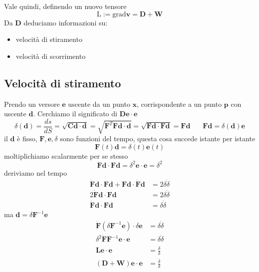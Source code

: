 \documentclass[10pt,a4paper,twoside]{book}
\begin{document}
Vale quindi, definendo un nuovo tensore
\begin{equation*}
\mathrm{L :=grad}\mathbf{v} =\mathbf{D} +\mathbf{W}
\end{equation*}
Da $\mathbf{D}$ deduciamo informazioni su:
\begin{itemize}
\item velocità di stiramento
\item velocità di scorrimento
\end{itemize}
\subsection{Velocità di stiramento}

Prendo un versore $\mathbf{e}$ uscente da un punto $\mathbf{x}$, corrispondente a un punto $\mathbf{p}$ con uscente $\mathbf{d}$. Cerchiamo il significato di $\mathbf{De} \cdotp \mathbf{e}$
\begin{equation*}
\delta (\mathbf{d}) =\frac{ds}{dS} =\sqrt{\mathbf{Cd} \cdotp \mathbf{d}} =\sqrt{\mathbf{F}^{T}\mathbf{Fd} \cdotp \mathbf{d}} =\sqrt{\mathbf{Fd} \cdotp \mathbf{Fd}} =\mathbf{Fd} \ \ \ \ \ \ \ \ \mathbf{Fd} =\delta (\mathbf{d})\mathbf{e}
\end{equation*}
il $\mathbf{d}$ è fisso, $\mathbf{F} ,\mathbf{e} ,\delta $ sono funzioni del tempo, questa cosa succede istante per istante
\begin{equation*}
\mathbf{F}( t)\mathbf{d} =\delta ( t)\mathbf{e}( t)
\end{equation*}
moltiplichiamo scalarmente per se stesso
\begin{equation*}
\mathbf{Fd} \cdotp \mathbf{Fd} =\delta ^{2}\mathbf{e} \cdotp \mathbf{e} =\delta ^{2}
\end{equation*}
deriviamo nel tempo
\begin{align*}
\dot{\mathbf{F}}\mathbf{d} \cdotp \mathbf{Fd} +\mathbf{Fd} \cdotp \dot{\mathbf{F}}\mathbf{d} & =2\delta \dot{\delta }\\
2\dot{\mathbf{F}}\mathbf{d} \cdotp \mathbf{Fd} & =2\delta \dot{\delta }\\
\dot{\mathbf{F}}\mathbf{d} \cdotp \mathbf{Fd} & =\delta \dot{\delta }
\end{align*}
ma $\mathbf{d} =\delta \mathbf{F}^{-1}\mathbf{e}$
\begin{align*}
\dot{\mathbf{F}}\left( \delta \mathbf{F}^{-1}\mathbf{e}\right) \cdotp \delta \mathbf{e} & =\delta \dot{\delta }\\
\delta ^{2}\dot{\mathbf{F}}\mathbf{F}^{-1}\mathbf{e} \cdotp \mathbf{e} & =\delta \dot{\delta }\\
\mathbf{Le} \cdotp \mathbf{e} & =\frac{\dot{\delta }}{\delta }\\
(\mathbf{D} +\mathbf{W})\mathbf{e} \cdotp \mathbf{e} & =\frac{\dot{\delta }}{\delta }
\end{align*}
\end{document}
